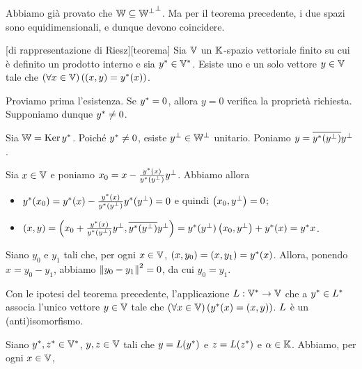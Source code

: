 \Proof Abbiamo gi\`a provato che $\mathbb{W} \subseteq {{\mathbb{W}}^\perp}^\perp$. Ma per il teorema precedente, i due spazi sono equidimensionali, e dunque devono coincidere. \EndProof
\begin{Theorem}
	[di rappresentazione di Riesz][teorema]
  Sia $\mathbb{V}$ un $\mathbb{K}$-spazio vettoriale finito su cui \`e definito un
  prodotto interno e sia ${{y}^*} \in {{\mathbb{V}}^*}$.
  Esiste uno e un solo vettore $y \in \mathbb{V}$ tale che
  $\left ( \forall x \in \mathbb{V} \right ) \left ( \left ( x , y \right ) = {{y}^*}(x) \right )$.
\end{Theorem}
\Proof Proviamo prima l'esistenza. Se ${{y}^*} = 0$, allora $y = 0$ verifica la propriet\`a richiesta. Supponiamo dunque ${{y}^*} \neq 0$.
\par Sia $\mathbb{W} = \operatorname{Ker}{{{y}^*}}$. Poich\'e ${{y}^*} \neq 0$, esiste $y^\perp \in {\mathbb{W}}^\perp$ unitario. Poniamo $y = \overline{{{y}^*}(y^\perp)}y^\perp$.
\par Sia $x \in \mathbb{V}$ e poniamo $x_0 = x - \frac{{{y}^*}(x)}{{{y}^*}(y^\perp)}y^\perp$. Abbiamo allora
\begin{itemize}
	\item ${{y}^*}(x_0) = {{y}^*}(x) - \frac{{{y}^*}(x)}{{{y}^*}(y^\perp)}{{y}^*}(y^\perp) = 0$ e quindi $\left ( x_0 , y^\perp \right ) = 0$;
	\item $\left ( x , y \right ) = \left ( x_0 + \frac{{{y}^*}(x)}{{{y}^*}(y^\perp)}y^\perp , \overline{{{y}^*}(y^\perp)}y^\perp \right ) = {{y}^*}(y^\perp)\left ( x_0 , y^\perp \right ) + {{y}^*}(x) = {{y}^*}{x}$.
\end{itemize}
\par Siano $y_0$ e $y_1$ tali che, per ogni $x \in \mathbb{V}$, $\left ( x , y_0 \right ) = \left ( x , y_1 \right ) = {{y}^*}(x)$. Allora, ponendo $x = y_0 - y_1$, abbiamo $\Norm{y_0 - y_1}^2 = 0$, da cui $y_0 = y_1$. \EndProof
\begin{Corollary}
	Con le ipotesi del teorema precedente, l'applicazione $L: {{\mathbb{V}}^*} \rightarrow \mathbb{V}$ che a ${{y}^*} \in {{L}^*}$ associa l'unico vettore $y \in \mathbb{V}$ tale che $\left ( \forall x \in \mathbb{V} \right ) \left ( {{y}^*}(x) = \left ( x , y \right ) \right )$. $L$ \`e un (anti)isomorfismo.
\end{Corollary}
\Proof Siano ${{y}^*}, {{z}^*} \in {{\mathbb{V}}^*}$, $y, z \in \mathbb{V}$ tali che $y = L({{y}^*})$ e $z = L({{z}^*})$ e $\alpha \in \mathbb{K}$. Abbiamo, per ogni $x \in \mathbb{V}$,
